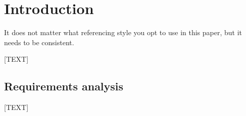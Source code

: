 \chapter{Introduction}

It does not matter what referencing style you opt to use in this paper, but it needs to be consistent. \cite{Castleman98}

[TEXT]

\section{Requirements analysis}

[TEXT]